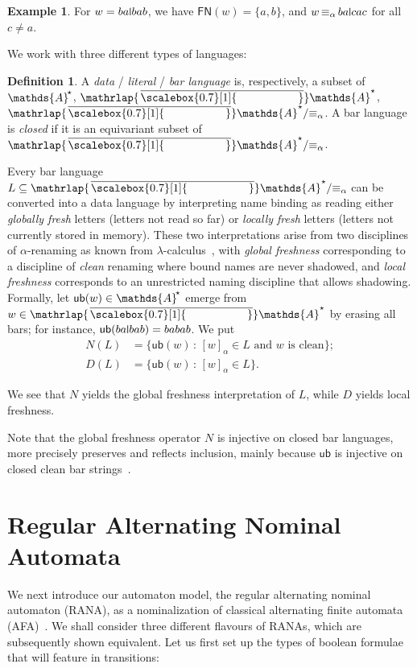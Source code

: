 \documentclass[10pt,a4paper]{amsart}
\theoremstyle{definition}
\newtheorem{defn}[theo]{Definition}
\newtheorem{example}[theo]{Example}
\newcommand{\seq}{\subseteq}
\newcommand{\At}{\mathds{A}}
\newcommand{\Ats}{\At^{\!\raisebox{1pt}{\scriptsize$\star$}}}
\newcommand{\barAs}{\barNames^{\star}}
\newcommand{\names}{\At}
\newcommand{\setw}[2]{\{#1\,:\,#2\}}
\DeclareMathOperator{\alphaequiv}{\equiv_{\alpha}}
\newcommand{\mybar}[3]{%
  \mathrlap{\hspace{#2}\overline{\scalebox{#1}[1]{\phantom{\ensuremath{#3}}}}}\ensuremath{#3}
}
\newcommand{\FN}{\mathsf{FN}}
\newcommand{\barNames}{{\mybar{0.7}{1.25pt}{\names}}}
\newcommand{\ub}{{\mathsf{ub}}}
\newcommand{\midmid}{\hspace{0.2ex}{\rule[-0.1ex]{0.6pt}{1.65ex}}\hspace{0.2ex}}
\newcommand{\newletter}[1]{{\midmid}#1}
\newcommand{\quotient}[2]{#1/{#2}} %
\begin{document}
\begin{example} For $w = ba\newletter{b}ab$, we have $\FN(w)=\{a,b\}$, and $w \alphaequiv ba\newletter{c}ac$ for all $c\neq a$.
\end{example}
 We work with three different types of languages:

\begin{defn} A \emph{data} / \emph{literal} / \emph{bar language} is, respectively, a subset of $\Ats$, $\barAs$, $\quotient{\barAs}{\alphaequiv}$.
    A bar language is \emph{closed} if it is an equivariant subset of $\quotient{\barAs}{\alphaequiv}$. 
\end{defn}
Every bar language $L \seq \barAs/{\alphaequiv}$ can be converted into a data language by interpreting name binding as reading either \emph{globally fresh} letters (letters not read so far) or \emph{locally fresh} letters (letters not currently stored in memory).
These two interpretations arise from two disciplines of $\alpha$-renaming as known from $\lambda$-calculus~\cite{barendregt85}, with \emph{global freshness} corresponding to a discipline of \emph{clean} renaming where bound names are never shadowed, and \emph{local freshness} corresponds to an unrestricted naming discipline that allows shadowing. Formally, let $\ub(w)\in \Ats$ emerge from $w\in \barAs$ by erasing all bars; for instance, $\ub(ba\newletter{b}ab)=babab$. We put
\begin{equation}
  \begin{aligned}
    N(L) & = \setw{\ub(w)}{\text{$[w]_\alpha \in L$ and $w$ is
    clean}}; \\
    D(L) & = \setw{\ub(w)}{[w]_\alpha \in L}.
  \end{aligned}\label{eq:ND}
\end{equation}

We see that $N$ yields the global freshness interpretation of $L$, while $D$ yields local freshness.

Note that the global freshness operator $N$ is injective on closed bar
languages, more precisely preserves and reflects inclusion, mainly
because $\ub$ is injective on closed clean bar
strings~\cite[Lemma~A.3]{skmw17}.



\section{Regular Alternating Nominal Automata}\label{sec:rana}
We next introduce our automaton model, the regular alternating nominal automaton (RANA),
as a nominalization of classical alternating finite automata (AFA)~\cite{cks81}. %
We shall consider three different flavours of RANAs, which are subsequently shown equivalent. 
Let us first set up the types of boolean formulae that will feature in transitions:
\end{document}

